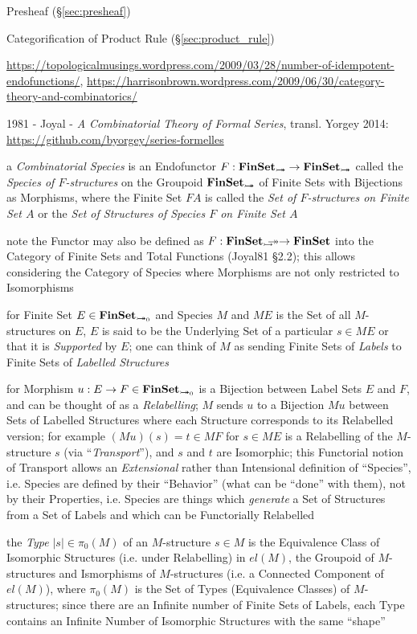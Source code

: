 Presheaf (\S\ref{sec:presheaf})

Categorification of Product Rule (\S\ref{sec:product_rule}) %

\url{https://topologicalmusings.wordpress.com/2009/03/28/number-of-idempotent-endofunctions/},
\url{https://harrisonbrown.wordpress.com/2009/06/30/category-theory-and-combinatorics/}

1981 - Joyal - \emph{A Combinatorial Theory of Formal Series}, transl. Yorgey
2014: \url{https://github.com/byorgey/series-formelles}

a \emph{Combinatorial Species} is an Endofunctor $F : \mathbf{FinSet}_{\rightarrowtail\hspace{-8pt}\twoheadrightarrow}
\rightarrow \mathbf{FinSet}_{\rightarrowtail\hspace{-8pt}\twoheadrightarrow}$ called the \emph{Species of $F$-structures}
on the Groupoid $\mathbf{FinSet}_{\rightarrowtail\hspace{-8pt}\twoheadrightarrow}$ of Finite Sets with Bijections as
Morphisms, where the Finite Set $F A$ is called the \emph{Set of $F$-structures
  on Finite Set $A$} or the \emph{Set of Structures of Species $F$ on Finite Set
  $A$}

note the Functor may also be defined as $F : \mathbf{FinSet}_\rightarrowtail\hspace{-8pt}\twoheadrightarrow \rightarrow
\mathbf{FinSet}$ into the Category of Finite Sets and Total Functions (Joyal81
\S2.2); this allows considering the Category of Species where Morphisms are not
only restricted to Isomorphisms

for Finite Set $E \in \mathbf{FinSet}_{\rightarrowtail\hspace{-8pt}\twoheadrightarrow_0}$ and Species $M$ and $M E$ is the
Set of all $M$-structures on $E$, $E$ is said to be the Underlying Set of a
particular $s \in M E$ or that it is \emph{Supported} by $E$; one can think of
$M$ as sending Finite Sets of \emph{Labels} to Finite Sets of \emph{Labelled
  Structures}

for Morphism $u : E \rightarrow F \in \mathbf{FinSet}_{\rightarrowtail\hspace{-8pt}\twoheadrightarrow_0}$ is a Bijection
between Label Sets $E$ and $F$, and can be thought of as a \emph{Relabelling};
$M$ sends $u$ to a Bijection $M u$ between Sets of Labelled Structures where
each Structure corresponds to its Relabelled version; for example
$(M u)(s) = t \in M F$ for $s \in M E$ is a Relabelling of the $M$-structure
$s$ (via ``\emph{Transport}''), and $s$ and $t$ are Isomorphic; this Functorial
notion of Transport allows an \emph{Extensional} rather than Intensional
definition of ``Species'', i.e. Species are defined by their ``Behavior'' (what
can be ``done'' with them), not by their Properties, i.e. Species are things
which \emph{generate} a Set of Structures from a Set of Labels and which can be
Functorially Relabelled

the \emph{Type} $|s| \in \pi_0(M)$ of an $M$-structure $s \in M$ is the
Equivalence Class of Isomorphic Structures (i.e. under Relabelling) in $el(M)$,
the Groupoid of $M$-structures and Ismorphisms of $M$-structures (i.e. a
Connected Component of $el(M)$), where $\pi_0(M)$ is the Set of Types
(Equivalence Classes) of $M$-structures; since there are an Infinite number of
Finite Sets of Labels, each Type contains an Infinite Number of Isomorphic
Structures with the same ``shape''

